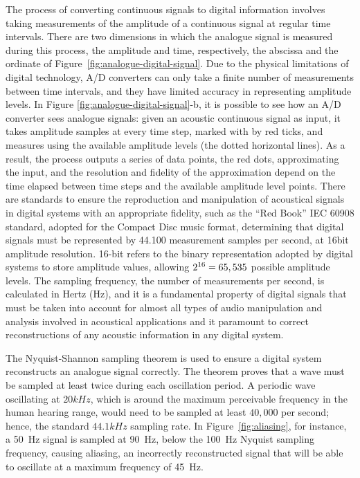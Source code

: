 The process of converting continuous signals to digital information involves taking measurements of the amplitude of a continuous signal at regular time intervals. There are two dimensions in which the analogue signal is measured during this process, the amplitude and time, respectively, the abscissa and the ordinate of Figure~\ref{fig:analogue-digital-signal}. Due to the physical limitations of digital technology, A/D converters can only take a finite number of measurements between time intervals, and they have limited accuracy in representing amplitude levels. In Figure \ref{fig:analogue-digital-signal}-b, it is possible to see how an A/D converter sees analogue signals: given an acoustic continuous signal as input, it takes amplitude samples at every time step, marked with by red ticks, and measures using the available amplitude levels (the dotted horizontal lines). As a result, the process outputs a series of data points, the red dots, approximating the input, and the resolution and fidelity of the approximation depend on the time elapsed between time steps and the available amplitude level points. There are standards to ensure the reproduction and manipulation of acoustical signals in digital systems with an appropriate fidelity, such as the ``Red Book'' IEC 60908 standard, adopted for the Compact Disc music format, determining that digital signals must be represented by 44.100 measurement samples per second, at 16bit amplitude resolution. 16-bit refers to the binary representation adopted by digital systems to store amplitude values, allowing $2\textsuperscript{16}=65,535$ possible amplitude levels. The sampling frequency, the number of measurements per second, is calculated in Hertz (Hz), and it is a fundamental property of digital signals that must be taken into account for almost all types of audio manipulation and analysis involved in acoustical applications and it paramount to correct reconstructions of any acoustic information in any digital system. \par
The Nyquist-Shannon sampling theorem is used to ensure a digital system reconstructs an analogue signal correctly. The theorem proves that a wave must be sampled at least twice during each oscillation period. A periodic wave oscillating at $20kHz$, which is around the maximum perceivable frequency in the human hearing range, would need to be sampled at least $40,000$ per second; hence, the standard $44.1kHz$ sampling rate. In Figure~\ref{fig:aliasing}, for instance, a \qty{50}{\hertz} signal is sampled at  \qty{90}{\hertz}, below the  \qty{100}{\hertz} Nyquist sampling frequency, causing aliasing, an incorrectly reconstructed signal that will be able to oscillate at a maximum frequency of  \qty{45}{\hertz}.\par
